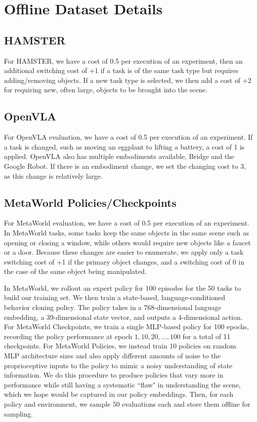 \appendices

\section{Offline Dataset Details}
\label{app:offline_datasets}

\subsection{HAMSTER}
For HAMSTER, we have a cost of 0.5 per execution of an experiment, then an additional switching cost of +1 if a task is of the same task type but requires adding/removing objects.
If a new task type is selected, we then add a cost of +2 for requiring new, often large, objects to be brought into the scene.

\subsection{OpenVLA}
For OpenVLA evaluation, we have a cost of 0.5 per execution of an experiment. 
If a task is changed, such as moving an eggplant to lifting a battery, a cost of 1 is applied.
OpenVLA also has multiple embodiments available, Bridge and the Google Robot.
If there is an embodiment change, we set the changing cost to 3, as this change is relatively large.

\subsection{MetaWorld Policies/Checkpoints}
For MetaWorld evaluation, we have a cost of 0.5 per execution of an experiment.
In MetaWorld tasks, some tasks keep the same objects in the same scene such as opening or closing a window, while others would require new objects like a faucet or a door.
Because these changes are easier to enumerate, we apply only a task switching cost of +1 if the primary object changes, and a switching cost of 0 in the case of the same object being manipulated.

In MetaWorld, we rollout an expert policy for 100 episodes for the 50 tasks to build our training set.
We then train a state-based, language-conditioned behavior cloning policy.
The policy takes in a 768-dimensional language embedding, a 39-dimensional state vector, and outputs a 4-dimensional action. 
For MetaWorld Checkpoints, we train a single MLP-based policy for 100 epochs, recording the policy performance at epoch $1, 10, 20, ..., 100$ for a total of 11 checkpoints. 
For MetaWorld Policies, we instead train 10 policies on random MLP architecture sizes and also apply different amounts of noise to the proprioceptive inputs to the policy to mimic a noisy understanding of state information.
We do this procedure to produce policies that vary more in performance while still having a systematic ``flaw" in understanding the scene, which we hope would be captured in our policy embeddings.
Then, for each policy and environment, we sample 50 evaluations each and store them offline for sampling.